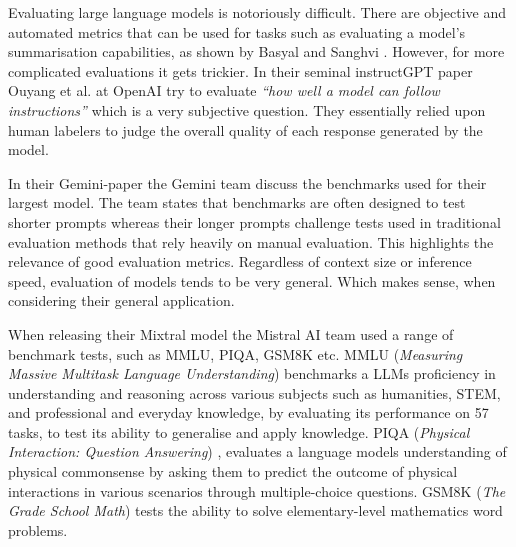

Evaluating large language models is notoriously difficult. There are objective and automated metrics that can be used for tasks such as evaluating a model's summarisation capabilities, as shown by Basyal and Sanghvi \cite{basyal_text_2023}. However, for more complicated evaluations it gets trickier. In their seminal instructGPT paper Ouyang et al. at OpenAI try to evaluate \textit{“how well a model can follow instructions”} \cite{ouyang_training_2022} which is a very subjective question. They essentially relied upon human labelers to judge the overall quality of each response generated by the model.


In their Gemini-paper the Gemini team discuss the benchmarks used for their largest model. The team states that benchmarks are often designed to test shorter prompts whereas their longer prompts challenge tests used in traditional evaluation methods that rely heavily on manual evaluation. This highlights the relevance of good evaluation metrics. Regardless of context size or inference speed, evaluation of models tends to be very general. Which makes sense, when considering their general application.


When releasing their Mixtral model \cite{jiang_mixtral_2024} the Mistral AI team used a range of benchmark tests, such as MMLU, PIQA, GSM8K etc. MMLU (\textit{Measuring Massive Multitask Language Understanding}) \cite{hendrycks_measuring_2021} benchmarks a LLMs proficiency in understanding and reasoning across various subjects such as humanities, STEM, and professional and everyday knowledge, by evaluating its performance on 57 tasks, to test its ability to generalise and apply knowledge. PIQA (\textit{Physical Interaction: Question Answering}) \cite{bisk_piqa_2019}, evaluates a language models understanding of physical commonsense by asking them to predict the outcome of physical interactions in various scenarios through multiple-choice questions. GSM8K (\textit{The Grade School Math}) \cite{cobbe_training_2021} tests the ability to solve elementary-level mathematics word problems.


